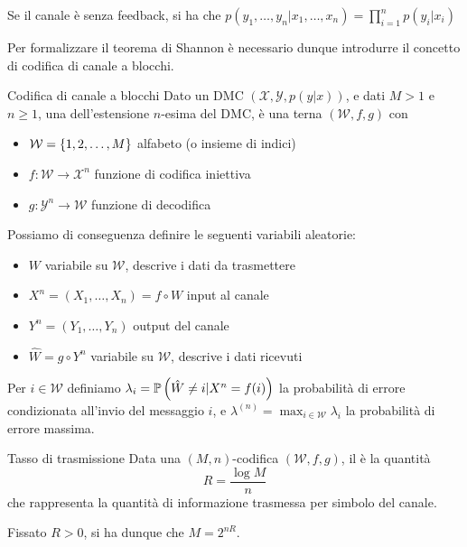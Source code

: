 Se il canale è senza feedback, si ha che \(p(y_1,\ldots,y_n|x_1,\ldots,x_n) = \prod_{i=1}^n p(y_i|x_i)\)

Per formalizzare il teorema di Shannon è necessario dunque introdurre il concetto di codifica di canale a blocchi.

\begin{definition}{Codifica di canale a blocchi}
  Dato un DMC \((\mathcal{X}, \mathcal{Y}, p(y|x))\), e dati \(M>1\) e \(n\geq 1\), una  dell'estensione \(n\)-esima del DMC, è una terna \((\mathcal{W},f,g)\) con
  \begin{itemize}
    \item \(\mathcal{W} = \set{1,2,\ldots,M}\) alfabeto (o insieme di indici)
    \item \(f: \mathcal{W} \to \mathcal{X}^n\) funzione di codifica iniettiva
    \item \(g: \mathcal{Y}^n \to \mathcal{W}\) funzione di decodifica
  \end{itemize}

  Possiamo di conseguenza definire le seguenti variabili aleatorie:
  \begin{itemize}
    \item \(W\) variabile su \(\mathcal{W}\), descrive i dati da trasmettere
    \item \(X^n = (X_1, \ldots, X_n) = f\circ W\) input al canale
    \item \(Y^n = (Y_1, \ldots, Y_n)\) output del canale
    \item \(\hat{W} = g \circ Y^n\) variabile su \(\mathcal{W}\), descrive i dati ricevuti
  \end{itemize}

  Per \(i \in \mathcal{W}\) definiamo \(\lambda_i = \Prob[\hat{W}\neq i|X^n = f(i)]\) la probabilità di errore condizionata all'invio del messaggio \(i\), e \(\lambda^{(n)} = \max_{i\in\mathcal{W}} \lambda_i\) la probabilità di errore massima.
\end{definition}

\begin{definition}{Tasso di trasmissione}
  Data una \((M,n)\)\nobreakdash-codifica \((\mathcal{W},f,g)\), il  è la quantità
  \[R = \frac{\log M}{n}\] 
  che rappresenta la quantità di informazione trasmessa per simbolo del canale.
  
  Fissato \(R>0\), si ha dunque che \(M = 2^{nR}\).
\end{definition}

